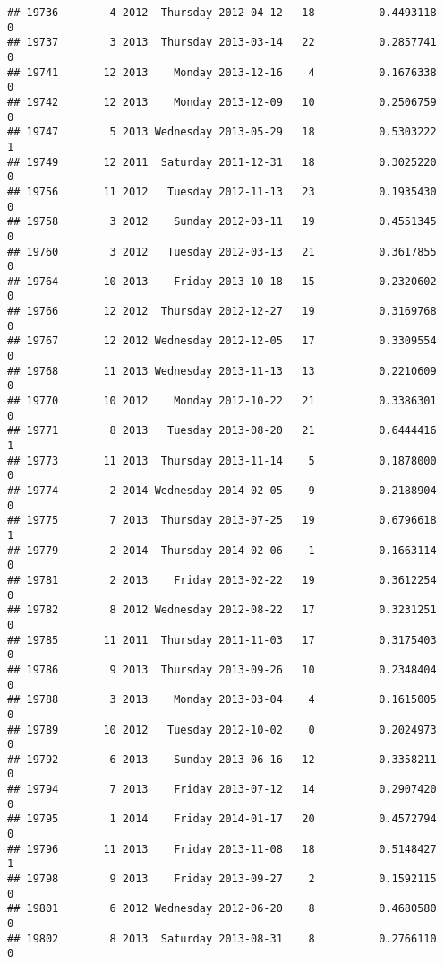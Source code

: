 \documentclass[
]{article}
\begin{document}
\begin{verbatim}
## 19736        4 2012  Thursday 2012-04-12   18          0.4493118             0
## 19737        3 2013  Thursday 2013-03-14   22          0.2857741             0
## 19741       12 2013    Monday 2013-12-16    4          0.1676338             0
## 19742       12 2013    Monday 2013-12-09   10          0.2506759             0
## 19747        5 2013 Wednesday 2013-05-29   18          0.5303222             1
## 19749       12 2011  Saturday 2011-12-31   18          0.3025220             0
## 19756       11 2012   Tuesday 2012-11-13   23          0.1935430             0
## 19758        3 2012    Sunday 2012-03-11   19          0.4551345             0
## 19760        3 2012   Tuesday 2012-03-13   21          0.3617855             0
## 19764       10 2013    Friday 2013-10-18   15          0.2320602             0
## 19766       12 2012  Thursday 2012-12-27   19          0.3169768             0
## 19767       12 2012 Wednesday 2012-12-05   17          0.3309554             0
## 19768       11 2013 Wednesday 2013-11-13   13          0.2210609             0
## 19770       10 2012    Monday 2012-10-22   21          0.3386301             0
## 19771        8 2013   Tuesday 2013-08-20   21          0.6444416             1
## 19773       11 2013  Thursday 2013-11-14    5          0.1878000             0
## 19774        2 2014 Wednesday 2014-02-05    9          0.2188904             0
## 19775        7 2013  Thursday 2013-07-25   19          0.6796618             1
## 19779        2 2014  Thursday 2014-02-06    1          0.1663114             0
## 19781        2 2013    Friday 2013-02-22   19          0.3612254             0
## 19782        8 2012 Wednesday 2012-08-22   17          0.3231251             0
## 19785       11 2011  Thursday 2011-11-03   17          0.3175403             0
## 19786        9 2013  Thursday 2013-09-26   10          0.2348404             0
## 19788        3 2013    Monday 2013-03-04    4          0.1615005             0
## 19789       10 2012   Tuesday 2012-10-02    0          0.2024973             0
## 19792        6 2013    Sunday 2013-06-16   12          0.3358211             0
## 19794        7 2013    Friday 2013-07-12   14          0.2907420             0
## 19795        1 2014    Friday 2014-01-17   20          0.4572794             0
## 19796       11 2013    Friday 2013-11-08   18          0.5148427             1
## 19798        9 2013    Friday 2013-09-27    2          0.1592115             0
## 19801        6 2012 Wednesday 2012-06-20    8          0.4680580             0
## 19802        8 2013  Saturday 2013-08-31    8          0.2766110             0

\end{verbatim}
\end{document}
